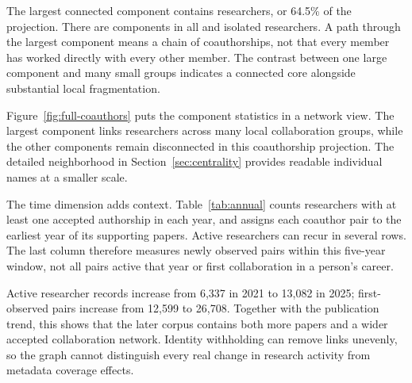 
The largest connected component contains \LargestComponent{} researchers,
or 64.5\% of the projection. There are \ResearcherComponents{} components in
all and \ResearcherIsolates{} isolated researchers. A path through the largest
component means a chain of coauthorships, not that every member has worked
directly with every other member. The contrast between one large component and
many small groups indicates a connected core alongside substantial local
fragmentation.



Figure~\ref{fig:full-coauthors} puts the component statistics in a network view.
The largest component links researchers across many local collaboration groups,
while the other components remain disconnected in this coauthorship projection.
The detailed neighborhood in Section~\ref{sec:centrality} provides readable
individual names at a smaller scale.
\FloatBarrier

The time dimension adds context. Table~\ref{tab:annual} counts researchers with
at least one accepted authorship in each year, and assigns each coauthor pair
to the earliest year of its supporting papers. Active researchers can recur in
several rows. The last column therefore measures newly observed pairs within
this five-year window, not all pairs active that year or first collaboration
in a person's career.


\FloatBarrier

Active researcher records increase from 6,337 in 2021 to 13,082 in 2025;
first-observed pairs increase from 12,599 to 26,708. Together with the
publication trend, this shows that the later corpus contains both more papers
and a wider accepted collaboration network. Identity withholding can remove
links unevenly, so the graph cannot distinguish every real change in research
activity from metadata coverage effects.

